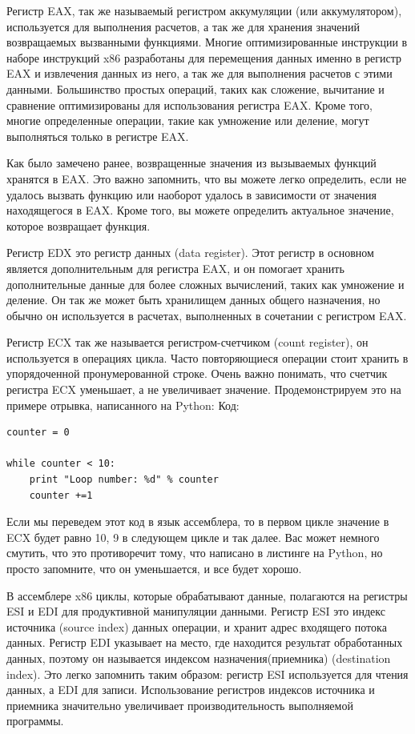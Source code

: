 \documentclass[12pt]{book}
\begin{document}
Регистр EAX, так же называемый регистром аккумуляции (или аккумулятором), используется для выполнения расчетов, а так же для хранения значений возвращаемых вызванными функциями. Многие оптимизированные инструкции в наборе инструкций x86 разработаны для перемещения данных именно в регистр EAX и извлечения данных из него, а так же для выполнения расчетов с этими данными. Большинство простых операций, таких как сложение, вычитание и сравнение оптимизированы для использования регистра EAX. Кроме того, многие определенные операции, такие как умножение или деление, могут выполняться только в регистре EAX.

Как было замечено ранее, возвращенные значения из вызываемых функций хранятся в EAX. Это важно запомнить, что вы можете легко определить, если не удалось вызвать функцию или наоборот удалось в зависимости от значения находящегося в EAX. Кроме того, вы можете определить актуальное значение, которое возвращает функция.

Регистр EDX это регистр данных (data register). Этот регистр в основном является дополнительным для регистра EAX, и он помогает хранить дополнительные данные для более сложных вычислений, таких как умножение и деление. Он так же может быть хранилищем данных общего назначения, но обычно он используется в расчетах, выполненных в сочетании с регистром EAX.

Регистр ECX так же называется регистром-счетчиком (count register), он используется в операциях цикла. Часто повторяющиеся операции стоит хранить в упорядоченной пронумерованной строке. Очень важно понимать, что счетчик регистра ECX уменьшает, а не увеличивает значение. Продемонстрируем это на примере отрывка, написанного на Python:
Код:
\begin{lstlisting}
counter = 0

while counter < 10:
    print "Loop number: %d" % counter
    counter +=1
\end{lstlisting}
Если мы переведем этот код в язык ассемблера, то в первом цикле значение в ECX будет равно 10, 9 в следующем цикле и так далее. Вас может немного смутить, что это противоречит тому, что написано в листинге на Python, но просто запомните, что он уменьшается, и все будет хорошо.

В ассемблере x86 циклы, которые обрабатывают данные, полагаются на регистры ESI и EDI для продуктивной манипуляции данными. Регистр ESI это индекс источника (source index) данных операции, и хранит адрес входящего потока данных. Регистр EDI указывает на место, где находится результат обработанных данных, поэтому он называется индексом назначения(приемника) (destination index). Это легко запомнить таким образом: регистр ESI используется для чтения данных, а EDI для записи. Использование регистров индексов источника и приемника значительно увеличивает производительность выполняемой программы.
\end{document}
